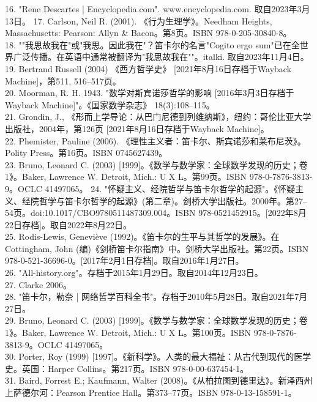 16. "Rene Descartes | Encyclopedia.com". www.encyclopedia.com. 取自2023年3月13日。
17. Carlson, Neil R. (2001). 《行为生理学》。Needham Heights, Massachusetts: Pearson: Allyn & Bacon。第8页。ISBN 978-0-205-30840-8。\\
18. ""我思故我在"或"我思。因此我在"？笛卡尔的名言"Cogito ergo sum"已在全世界广泛传播。在英语中通常被翻译为"我思故我在""。italki. 取自2023年11月4日。\\
19. Bertrand Russell (2004) 《西方哲学史》 [2021年8月16日存档于Wayback Machine]，第511, 516–517页。\\
20. Moorman, R. H. 1943. "数学对斯宾诺莎哲学的影响 [2016年3月3日存档于Wayback Machine]"。《国家数学杂志》 18(3):108–115。\\
21. Grondin, J., 《形而上学导论：从巴门尼德到列维纳斯》，纽约：哥伦比亚大学出版社，2004年，第126页 [2021年8月16日存档于Wayback Machine]。\\
22. Phemister, Pauline (2006). 《理性主义者：笛卡尔、斯宾诺莎和莱布尼茨》。Polity Press。第16页。ISBN 0745627439。\\
23. Bruno, Leonard C. (2003) [1999]。《数学与数学家：全球数学发现的历史；卷1》。Baker, Lawrence W. Detroit, Mich.: U X L。第99页。ISBN 978-0-7876-3813-9。OCLC 41497065。
24. "怀疑主义、经院哲学与笛卡尔哲学的起源"。《怀疑主义、经院哲学与笛卡尔哲学的起源》(第二章)。剑桥大学出版社。2000年。第27–54页。doi:10.1017/CBO9780511487309.004。ISBN 978-0521452915。[2022年8月22日存档]。取自2022年8月22日。\\
25. Rodis-Lewis, Geneviève (1992)。《笛卡尔的生平与其哲学的发展》。在Cottingham, John (编)《剑桥笛卡尔指南》中。剑桥大学出版社。第22页。ISBN 978-0-521-36696-0。[2017年2月1日存档]。取自2016年1月27日。\\
26. "All-history.org"。存档于2015年1月29日。取自2014年12月23日。\\
27. Clarke 2006。\\
28. "笛卡尔，勒奈 | 网络哲学百科全书"。存档于2010年5月28日。取自2021年7月27日。\\
29. Bruno, Leonard C. (2003) [1999]。《数学与数学家：全球数学发现的历史；卷1》。Baker, Lawrence W. Detroit, Mich.: U X L。第100页。ISBN 978-0-7876-3813-9。OCLC 41497065。\\
30. Porter, Roy (1999) [1997]。《新科学》。人类的最大福祉：从古代到现代的医学史。英国：Harper Collins。第217页。ISBN 978-0-00-637454-1。\\
31. Baird, Forrest E.; Kaufmann, Walter (2008)。《从柏拉图到德里达》。新泽西州上萨德尔河：Pearson Prentice Hall。第373–77页。ISBN 978-0-13-158591-1。\\
